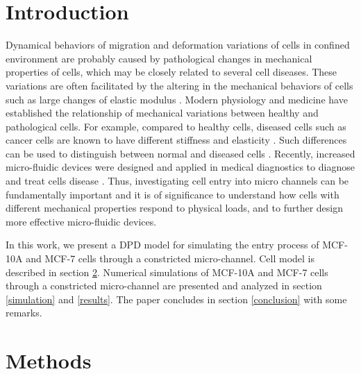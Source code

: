 \documentclass[review]{elsarticle}
\begin{document}
\linenumbers

\section{Introduction}
Dynamical behaviors of migration and deformation variations of cells in confined environment are probably caused by pathological changes in mechanical properties of cells, which may be closely related to several cell diseases. These variations are often facilitated by the altering in the mechanical behaviors of cells such as large changes of elastic modulus \cite{hosseini_particle-based_2009}. Modern physiology and medicine have established the relationship of mechanical variations between healthy and pathological cells. For example, compared to healthy cells, diseased cells such as cancer cells are known to have different stiffness and elasticity \cite{lee_biomechanics_2007}. Such differences can be used to distinguish between normal and diseased cells \cite{bathe_neutrophil_2002,hou_deformability_2009}. Recently, increased micro-fluidic devices were designed and applied in medical diagnostics to diagnose and treat cells disease \cite{suresh_biomechanics_2007,liu_microfluidic_2010}. 
Thus, investigating cell entry into micro channels can be fundamentally important and it is of significance to understand how cells with different mechanical properties respond to physical loads, and to further design more effective micro-fluidic devices. 

In this work, we present a DPD model for simulating the entry process of  MCF-10A and MCF-7 cells through a constricted micro-channel. Cell model is described in section \ref{cell}.  Numerical simulations of MCF-10A and MCF-7 cells through a constricted micro-channel are presented and analyzed in section \ref{simulation} and \ref{results}. The paper concludes in section \ref{conclusion} with some remarks. 
\section{Methods}\label{cell}
\end{document}
